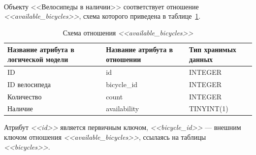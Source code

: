 \paragraph{}
Объекту <<Велосипеды в наличии>> соответствует отношение \textit{<<available\_bicycles>>},
схема которого приведена в таблице~\ref{tbl:available_bicycles_scheme}.
\begin{table}[h!]
  \caption{Схема отношения \textit{<<available\_bicycles>>}}
  \label{tbl:available_bicycles_scheme}
  \small{
    \centering
    \begin{tabular}{| p{} | p{} | p{} |}
      \hline
      Название атрибута в \newline логической модели &
      Название атрибута в \newline отношении &
      Тип хранимых данных \\

      \hline
      ID & id & INTEGER \\

      \hline
      ID велосипеда & bicycle\_id & INTEGER \\

      \hline
      Количество & count & INTEGER \\

      \hline
      Наличие & availability & TINYINT(1) \\

      \hline
    \end{tabular}
  }
\end{table}

Атрибут \textit{<<id>>} является первичным ключом, \textit{<<bicycle\_id>>} --- внешним ключом
отношения \textit{<<available\_bicycles>>}, ссылаясь на таблицы \textit{<<bicycles>>}.

